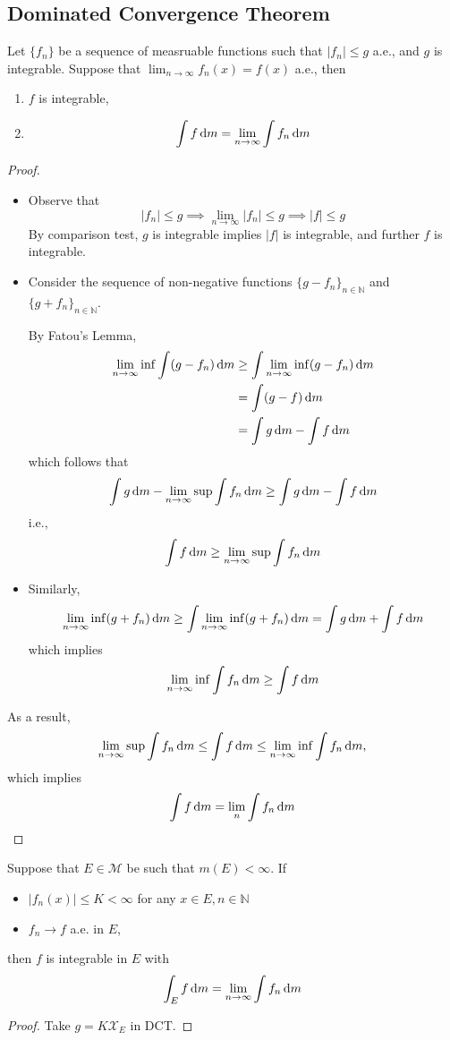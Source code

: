 \subsection{Dominated Convergence Theorem}
\begin{theorem}
Let $\{f_n\}$ be a sequence of measruable functions such that $|f_n|\le g$ a.e., and $g$ is integrable.
Suppose that $\lim_{n\to\infty}f_n(x)=f(x)$ a.e., then
\begin{enumerate}
\item
$f$ is integrable,
\item
\[
\int f\,\mathrm{d} m =\lim_{n\to\infty}\int f_n\,\mathrm{d} m
\]
\end{enumerate}
\end{theorem}
\begin{proof}
\begin{itemize}
\item
Observe that 
\[
|f_n|\le g\implies
\lim_{n\to\infty}|f_n|\le g\implies |f|\le g
\]
By comparison test, $g$ is integrable implies $|f|$ is integrable, and further $f$ is integrable.
\item
Consider the sequence of non-negative functions
$\{g-f_n\}_{n\in\mathbb{N}}$ and $\{g+f_n\}_{n\in\mathbb{N}}$.

By Fatou's Lemma, 
\begin{align*}
\lim_{n\to\infty}\inf\int(g-f_n)\,\mathrm{d} m&\ge \int \lim_{n\to\infty}\inf(g-f_n)\,\mathrm{d} m\\
&=\int(g-f)\,\mathrm{d} m\\
&=\int g\,\mathrm{d} m - \int f\,\mathrm{d} m
\end{align*}
which follows that
\[
\int g\,\mathrm{d} m - \lim_{n\to\infty}\sup\int f_n\,\mathrm{d} m
\ge
\int g\,\mathrm{d} m - \int f\,\mathrm{d} m
\]
i.e.,
\[
\int f\,\mathrm{d} m\ge  \lim_{n\to\infty}\sup\int f_n\,\mathrm{d} m
\]
\item
Similarly, 
\[
\lim_{n\to\infty}\inf(g+f_n)\,\mathrm{d} m\ge \int\lim_{n\to\infty}\inf(g+f_n)\,\mathrm{d} m
=
\int g\,\mathrm{d} m + \int f\,\mathrm{d} m
\]
which implies
\[
 \lim_{n\to\infty}\inf\int f_n\,\mathrm{d} m\ge\int f\,\mathrm{d} m
\]
\end{itemize}
As a result,
\[
 \lim_{n\to\infty}\sup\int f_n\,\mathrm{d} m
 \le
 \int f\,\mathrm{d} m\le  \lim_{n\to\infty}\inf\int f_n\,\mathrm{d} m,
\]
which implies
\[
\int f\,\mathrm{d} m = \lim_n\int f_n\,\mathrm{d} m
\]
\end{proof}

\begin{corollary}
Suppose that $E\in\mathcal{M}$ be such that $m(E)<\infty$.
If
\begin{itemize}
\item
$|f_n(x)|\le K<\infty$ for any $x\in E,n\in\mathbb{N}$
\item
$f_n\to f$ a.e. in $E$,
\end{itemize}
then $f$ is integrable in $E$ with
\[
\int_Ef\,\mathrm{d} m = \lim_{n\to\infty}\int f_n\,\mathrm{d} m
\]
\end{corollary}
\begin{proof}
Take $g=K\mathcal{X}_E$ in DCT.
\end{proof}


